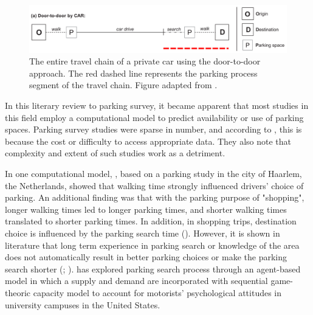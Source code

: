\begin{figure}[H]%
    \includegraphics[width=\textwidth]{images/door2door.png}
    \caption[Door-to-door approach]{The entire travel chain of a private car using the door-to-door approach. The red dashed line represents the parking process segment of the travel chain. Figure adapted from .}%
    \label{fig:door-to-door}%
\end{figure}

In this literary review to parking survey, it became apparent that most studies in this field employ a computational model to predict availability or use of parking spaces. Parking survey studies were sparse in number, and according to , this is because the cost or difficulty to access appropriate data. They also note that complexity and extent of such studies work as a detriment.

In one computational model, , based on a parking study in the city of Haarlem, the Netherlands, showed that walking time strongly influenced drivers' choice of parking. An additional finding was that with the parking purpose of "shopping", longer walking times led to longer parking times, and shorter walking times translated to shorter parking times. In addition, in shopping trips, destination choice is influenced by the parking search time (\cite{Axhausen1993}). However, it is shown in literature that long term experience in parking search or knowledge of the area does not automatically result in better parking choices or make the parking search shorter (\cite{Thompson1998}; \cite{Teng2002}).  has explored parking search process through an agent-based model in which a supply and demand are incorporated with sequential game-theoric capacity model to account for motorists' psychological attitudes in university campuses in the United States. 

